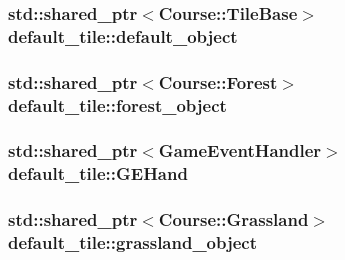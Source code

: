 \hypertarget{classdefault__tile_af0e444a7cbe271a0eca9a245fcd938ff}{
\subsubsection[{default\-\_\-object}]{\setlength{\rightskip}{0pt plus 5cm}std\-::shared\-\_\-ptr$<${\bf Course\-::\-Tile\-Base}$>$ default\-\_\-tile\-::default\-\_\-object\hspace{0.3cm}{\ttfamily [private]}}}\label{classdefault__tile_af0e444a7cbe271a0eca9a245fcd938ff}
\hypertarget{classdefault__tile_aed6aefdcd6b8d7ebf30d586e9143d44f}{
\subsubsection[{forest\-\_\-object}]{\setlength{\rightskip}{0pt plus 5cm}std\-::shared\-\_\-ptr$<${\bf Course\-::\-Forest}$>$ default\-\_\-tile\-::forest\-\_\-object\hspace{0.3cm}{\ttfamily [private]}}}\label{classdefault__tile_aed6aefdcd6b8d7ebf30d586e9143d44f}
\hypertarget{classdefault__tile_ac2682ad79db9879a601bc5bdd24add2c}{
\subsubsection[{G\-E\-Hand}]{\setlength{\rightskip}{0pt plus 5cm}std\-::shared\-\_\-ptr$<${\bf Game\-Event\-Handler}$>$ default\-\_\-tile\-::\-G\-E\-Hand\hspace{0.3cm}{\ttfamily [private]}}}\label{classdefault__tile_ac2682ad79db9879a601bc5bdd24add2c}
\hypertarget{classdefault__tile_ad5fbacd1a3d966e10aa6127db0ba3213}{
\subsubsection[{grassland\-\_\-object}]{\setlength{\rightskip}{0pt plus 5cm}std\-::shared\-\_\-ptr$<${\bf Course\-::\-Grassland}$>$ default\-\_\-tile\-::grassland\-\_\-object\hspace{0.3cm}{\ttfamily [private]}}}\label{classdefault__tile_ad5fbacd1a3d966e10aa6127db0ba3213}

